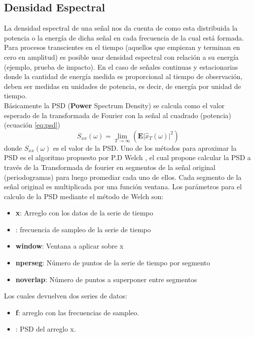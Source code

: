 		 	\subsection{Densidad Espectral}
		 		La densidad espectral de una señal nos da cuenta de como esta distribuida la potencia o la energía de dicha señal en cada frecuencia de la cual está formada. Para procesos transcientes en el tiempo (aquellos que empiezan y terminan en cero en amplitud) es posible usar densidad espectral con relación a su energía (ejemplo, prueba de impacto). En el caso de señales continuas y estacionarias donde la cantidad de energía medida es proporcional al tiempo de observación, deben ser medidas en unidades de potencia, es decir, de energía por unidad de tiempo.\\
		 		Básicamente la PSD (\textbf{Power} Spectrum Density) se calcula como el valor esperado de la transformada de Fourier con la señal al cuadrado (potencia) (ecuación \ref{eq:psd})
		 		\begin{equation}
			 		S_{xx}(\omega) = \lim_{T\to\infty}(\textbf{E}\lvert \hat{x}_T(\omega)\rvert^2)
			 		\label{eq:psd}
		 		\end{equation}
		 		donde $S_{xx}(\omega)$ es el valor de la PSD.
		 		Uno de los métodos para aproximar la PSD es el algoritmo propuesto por P.D Welch \cite{Welch1967}, el cual propone calcular la PSD a través de la Transformada de fourier en segmentos de la señal original (periodogramas) para luego promediar cada uno de ellos. Cada segmento de la señal original es multiplicada por una función ventana. Los parámetros para el calculo de la PSD mediante el método de Welch son:
		 		\begin{itemize}
		 			\item \textbf{x}: Arreglo con los datos de la serie de tiempo
		 			\item {}: frecuencia de sampleo de la serie de tiempo
		 			\item \textbf{window}: Ventana a aplicar sobre x
		 			\item \textbf{nperseg}: Número de puntos de la serie de tiempo por segmento
		 			\item \textbf{noverlap}: Número de puntos a superponer entre segmentos
	 			\end{itemize}
		 		Los cuales devuelven dos series de datos:
		 		\begin{itemize}
		 			\item \textbf{f}: arreglo con las frecuencias de sampleo.
		 			\item {}: PSD del arreglo x.		
		 		\end{itemize}
